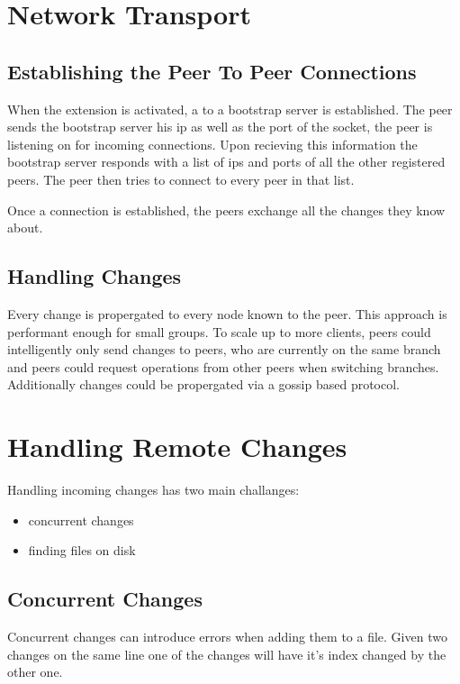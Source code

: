 \section{Network Transport}

\subsection{Establishing the Peer To Peer Connections}
When the extension is activated, a to a bootstrap server is established. 
The peer sends the bootstrap server his ip as well as the port of the socket, the peer is listening on for incoming connections.
Upon recieving this information the bootstrap server responds with a list of ips and ports of all the other registered peers.
The peer then tries to connect to every peer in that list.

Once a connection is established, the peers exchange all the changes they know about.

\subsection{Handling Changes}
Every change is propergated to every node known to the peer. This approach is performant enough for small groups. To scale up to more clients, peers could intelligently only send changes to peers, who are currently on the same branch and peers could request operations from other peers when switching branches. Additionally changes could be propergated via a gossip based protocol.

\section{Handling Remote Changes}

Handling incoming changes has two main challanges:
\begin{itemize}
    \item concurrent changes
    \item finding files on disk
\end{itemize}

\subsection{Concurrent Changes}
\label{subsec:concurrentchanges}
Concurrent changes can introduce errors when adding them to a file. 
Given two changes on the same line one of the changes will have it's index changed by the other one.

